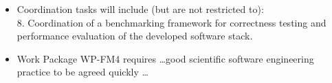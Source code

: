 \begin{itemize}
\item
Coordination tasks will include (but are not restricted to):\\
8. Coordination of a benchmarking framework for correctness testing and 
performance evaluation of the developed software stack.
\item
Work Package WP-FM4 requires \ldots good scientific software engineering practice to be agreed quickly \ldots
\end{itemize}
